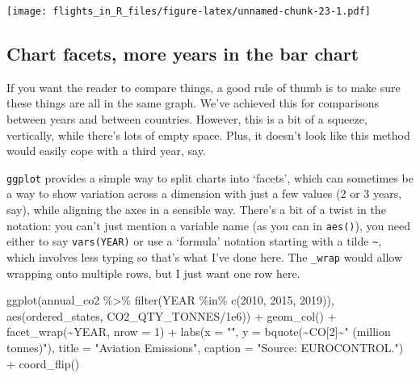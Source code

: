 \documentclass[
]{book}
\newenvironment{Shaded}{\begin{snugshade}}{\end{snugshade}}
\newcommand{\AttributeTok}[1]{\textcolor[rgb]{0.77,0.63,0.00}{#1}}
\newcommand{\DecValTok}[1]{\textcolor[rgb]{0.00,0.00,0.81}{#1}}
\newcommand{\FloatTok}[1]{\textcolor[rgb]{0.00,0.00,0.81}{#1}}
\newcommand{\FunctionTok}[1]{\textcolor[rgb]{0.00,0.00,0.00}{#1}}
\newcommand{\NormalTok}[1]{#1}
\newcommand{\SpecialCharTok}[1]{\textcolor[rgb]{0.00,0.00,0.00}{#1}}
\newcommand{\StringTok}[1]{\textcolor[rgb]{0.31,0.60,0.02}{#1}}
\begin{document}
\texttt{[image: flights\_in\_R\_files/figure-latex/unnamed-chunk-23-1.pdf]}

\hypertarget{chart-facets-more-years-in-the-bar-chart}{%
\subsection{Chart facets, more years in the bar chart}\label{chart-facets-more-years-in-the-bar-chart}}

If you want the reader to compare things, a good rule of thumb is to make sure these things are all in the same graph. We've achieved this for comparisons between years and between countries. However, this is a bit of a squeeze, vertically, while there's lots of empty space. Plus, it doesn't look like this method would easily cope with a third year, say.

\texttt{ggplot} provides a simple way to split charts into `facets', which can sometimes be a way to show variation across a dimension with just a few values (2 or 3 years, say), while aligning the axes in a sensible way. There's a bit of a twist in the notation: you can't just mention a variable name (as you can in \texttt{aes()}), you need either to say \texttt{vars(YEAR)} or use a `formula' notation starting with a tilde \texttt{\textasciitilde{}}, which involves less typing so that's what I've done here. The \texttt{\_wrap} would allow wrapping onto multiple rows, but I just want one row here.

\begin{Shaded}
\begin{Highlighting}[]
\FunctionTok{ggplot}\NormalTok{(annual\_co2 }\SpecialCharTok{\%\textgreater{}\%} 
         \FunctionTok{filter}\NormalTok{(YEAR }\SpecialCharTok{\%in\%} \FunctionTok{c}\NormalTok{(}\DecValTok{2010}\NormalTok{, }\DecValTok{2015}\NormalTok{, }\DecValTok{2019}\NormalTok{)), }
       \FunctionTok{aes}\NormalTok{(ordered\_states,}
\NormalTok{           CO2\_QTY\_TONNES}\SpecialCharTok{/}\FloatTok{1e6}\NormalTok{)) }\SpecialCharTok{+}  
  \FunctionTok{geom\_col}\NormalTok{() }\SpecialCharTok{+}
  \FunctionTok{facet\_wrap}\NormalTok{(}\SpecialCharTok{\textasciitilde{}}\NormalTok{YEAR, }\AttributeTok{nrow =} \DecValTok{1}\NormalTok{) }\SpecialCharTok{+} 
  \FunctionTok{labs}\NormalTok{(}\AttributeTok{x =} \StringTok{""}\NormalTok{, }
       \AttributeTok{y =} \FunctionTok{bquote}\NormalTok{(}\SpecialCharTok{\textasciitilde{}}\NormalTok{CO[}\DecValTok{2}\NormalTok{]}\SpecialCharTok{\textasciitilde{}}\StringTok{" (million tonnes)"}\NormalTok{),}
       \AttributeTok{title =} \StringTok{"Aviation Emissions"}\NormalTok{,}
       \AttributeTok{caption =} \StringTok{"Source: EUROCONTROL."}\NormalTok{) }\SpecialCharTok{+} 
  \FunctionTok{coord\_flip}\NormalTok{()}
\end{Highlighting}
\end{Shaded}
\end{document}
